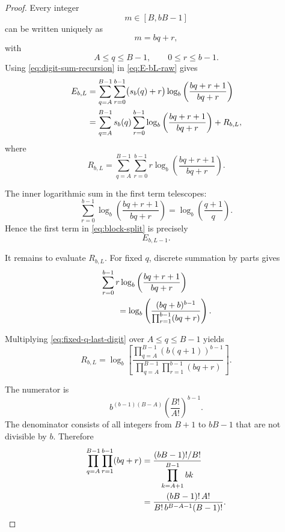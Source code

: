 \documentclass[11pt]{article}
\theoremstyle{definition}
\theoremstyle{remark}
\begin{document}
\begin{proof}
Every integer
\[
    m\in[B,bB-1]
\]
can be written uniquely as
\[
    m=bq+r,
\]
with
\[
    A\le q\le B-1,
    \qquad
    0\le r\le b-1.
\]
Using \eqref{eq:digit-sum-recursion} in
\eqref{eq:E-bL-raw} gives
\begin{align}
    E_{b,L}
    &=
    \sum_{q=A}^{B-1}
    \sum_{r=0}^{b-1}
    \bigl(s_b(q)+r\bigr)
    \log_b
    \left(
        \frac{bq+r+1}{bq+r}
    \right)
    \notag\\
    &=
    \sum_{q=A}^{B-1}
    s_b(q)
    \sum_{r=0}^{b-1}
    \log_b
    \left(
        \frac{bq+r+1}{bq+r}
    \right)
    +
    R_{b,L},
    \label{eq:block-split}
\end{align}
where
\begin{equation}
    R_{b,L}
    =
    \sum_{q=A}^{B-1}
    \sum_{r=0}^{b-1}
    r
    \log_b
    \left(
        \frac{bq+r+1}{bq+r}
    \right).
    \label{eq:R-bL-definition}
\end{equation}

The inner logarithmic sum in the first term telescopes:
\[
    \sum_{r=0}^{b-1}
    \log_b
    \left(
        \frac{bq+r+1}{bq+r}
    \right)
    =
    \log_b
    \left(
        \frac{q+1}{q}
    \right).
\]
Hence the first term in \eqref{eq:block-split} is precisely
\[
    E_{b,L-1}.
\]

It remains to evaluate \(R_{b,L}\).
For fixed \(q\), discrete summation by parts gives
\begin{align}
    &\sum_{r=0}^{b-1}
    r
    \log_b
    \left(
        \frac{bq+r+1}{bq+r}
    \right)
    \notag\\
    &\qquad=
    \log_b
    \left(
        \frac{
            (bq+b)^{b-1}
        }{
            \prod_{r=1}^{b-1}(bq+r)
        }
    \right).
    \label{eq:fixed-q-last-digit}
\end{align}

Multiplying \eqref{eq:fixed-q-last-digit} over
\(A\le q\le B-1\) yields
\begin{equation}
    R_{b,L}
    =
    \log_b
    \left[
        \frac{
            \displaystyle
            \prod_{q=A}^{B-1}
            (b(q+1))^{b-1}
        }{
            \displaystyle
            \prod_{q=A}^{B-1}
            \prod_{r=1}^{b-1}(bq+r)
        }
    \right].
    \label{eq:R-product}
\end{equation}

The numerator is
\begin{equation}
    b^{(b-1)(B-A)}
    \left(
        \frac{B!}{A!}
    \right)^{b-1}.
    \label{eq:R-numerator}
\end{equation}
The denominator consists of all integers from \(B+1\) to \(bB-1\)
that are not divisible by \(b\).  Therefore
\begin{align}
    \prod_{q=A}^{B-1}
    \prod_{r=1}^{b-1}(bq+r)
    &=
    \frac{
        (bB-1)!/B!
    }{
        \displaystyle
        \prod_{k=A+1}^{B-1}bk
    }
    \notag\\
    &=
    \frac{
        (bB-1)!\,A!
    }{
        B!\,
        b^{B-A-1}
        (B-1)!
    }.
    \label{eq:R-denominator}
\end{align}


\end{proof}
\end{document}
